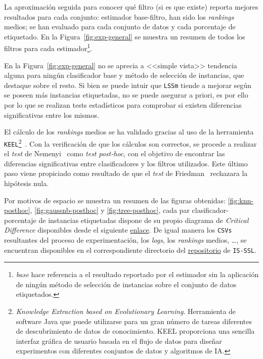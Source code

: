 La aproximación seguida para conocer qué filtro (si es que existe) reporta mejores resultados para cada conjunto: estimador base-filtro, han sido los \textit{rankings} medios; se han evaluado para cada conjunto de datos y cada porcentaje de etiquetado. En la Figura~\ref{fig:exp-general} se muestra un resumen de todos los filtros para cada estimador\footnote{\emph{base} hace referencia a el resultado reportado por el estimador sin la aplicación de ningún método de selección de instancias sobre el conjunto de datos etiquetados.}. 


En la Figura~\ref{fig:exp-general} no se aprecia a <<simple vista>> tendencia alguna para ningún clasificador base y método de selección de instancias, que destaque sobre el resto. Si bien se puede intuir que \texttt{LSSm} tiende a mejorar según se poseen más instancias etiquetadas, no se puede asegurar a priori, es por ello por lo que se realizan tests estadísticos para comprobar si existen diferencias significativas entre los mismos.

El cálculo de los \textit{rankings} medios se ha validado gracias al uso de la herramienta \texttt{KEEL}\footnote{\textit{Knowledge Extraction based on Evolutionary Learning}. Herramienta de software Java que puede utilizarse para un gran número de tareas diferentes de descubrimiento de datos de conocimiento. KEEL proporciona una sencilla interfaz gráfica de usuario basada en el flujo de datos para diseñar experimentos con diferentes conjuntos de datos y algoritmos de IA.}~\cite{alcala2009keel, alcala2011keel}. Con la verificación de que los cálculos son correctos, se procede a realizar el \textit{test} de Nemenyi~\cite{nemenyi1963distribution} como \textit{test} \textit{post-hoc}, con el objetivo de encontrar las diferencias significativas entre clasificadores y los filtros utilizados. Este último paso viene propiciado como resultado de que el \textit{test} de Friedman~\cite{friedman1937use} rechazara la hipótesis nula.

Por motivos de espacio se muestra un resumen de las figuras obtenidas: \ref{fig:knn-posthoc}, \ref{fig:gaussnb-posthoc} y \ref{fig:tree-posthoc},  cada par clasificador-porcentaje de instancias etiquetadas dispone de su propio diagrama de \emph{Critical Difference} disponibles desde el siguiente \href{https://github.com/dpr1005/Semisupervised-learning-and-instance-selection-methods/tree/main/experimentation/result_plots}{enlace}. De igual manera los \texttt{CSVs} resultantes del proceso de experimentación, los \textit{logs}, los \textit{rankings} medios, \dots, se encuentran disponibles en el correspondiente directorio del \href{https://github.com/dpr1005/Semisupervised-learning-and-instance-selection-methods/tree/main/experimentation}{repositorio} de \texttt{IS-SSL}.

